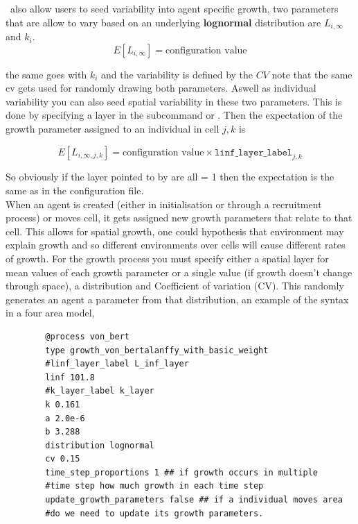 \IBM\ also allow users to seed variability into agent specific growth, two parameters that are allow to vary based on an underlying \textbf{lognormal} distribution are $L_{i,\infty}$ and $k_i$.\\

$$E[L_{i,\infty}] = \text{configuration value}$$

the same goes with $k_i$ and the variability is defined by the $CV$ note that the same cv gets used for randomly drawing both parameters. Aswell as individual variability you can also seed spatial variability in these two parameters. This is done by specifying a layer in the subcommand  or . Then the expectation of the growth parameter assigned to an individual in cell $j,k$ is 

$$E[L_{i,\infty,j,k}] = \text{configuration value}\times \texttt{linf\_layer\_label}_{j,k}$$

So obviously if the layer pointed to by  are all = 1 then the expectation is the same as in the configuration file.\\

When an agent is created (either in initialisation or through a recruitment process) or moves cell, it gets assigned new growth parameters that relate to that cell. This allows for spatial growth, one could hypothesis that environment may explain growth and so different environments over cells will cause different rates of growth. For the growth process you must specify either a spatial layer for mean values of each growth parameter or a single value (if growth doesn't change through space), a distribution and Coefficient of variation (CV). This randomly generates an agent a parameter from that distribution, an example of the syntax in a four area model,

{\small{\begin{verbatim}
		@process von_bert
		type growth_von_bertalanffy_with_basic_weight
		#linf_layer_label L_inf_layer
		linf 101.8
		#k_layer_label k_layer
		k 0.161
		a 2.0e-6 
		b 3.288
		distribution lognormal
		cv 0.15
		time_step_proportions 1 ## if growth occurs in multiple 
		#time step how much growth in each time step
		update_growth_parameters false ## if a individual moves area 
		#do we need to update its growth parameters.
		\end{verbatim}}}



